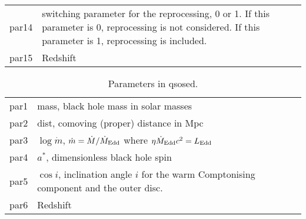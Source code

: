 \documentclass[a4paper,fleqn,usenatbib]{mnras}
\begin{document}
\begin{table}
\begin{tabular}{lp{7cm}}
par14 &switching parameter for the reprocessing, 0 or 1. If this parameter is 0, reprocessing is not considered. If this parameter is 1, reprocessing is included.\\
par15 & Redshift\\
\hline
\end{tabular}
\end{table}


\begin{table}
	\centering
	\caption{Parameters in {\sc qsosed}. }
	\label{tab:appendix2}
	\begin{tabular}{lp{7cm}} 
		\hline
par1 &mass, black hole mass in solar masses\\
par2 &dist, comoving (proper) distance in Mpc\\
par3 & $\log\dot{m}$, $\dot{m}=\dot{M}/\dot{M}_{\rm Edd}$ where $\eta\dot{M}_{\rm Edd}c^2=L_{\rm Edd}$\\
par4 & $a^\ast$, dimensionless black hole spin\\
par5 & $\cos i$, inclination angle $i$ for the warm Comptonising component and the outer disc.\\
par6 & Redshift\\
\hline
\end{tabular}
\end{table}





\bsp	%
\label{lastpage}
\end{document}
